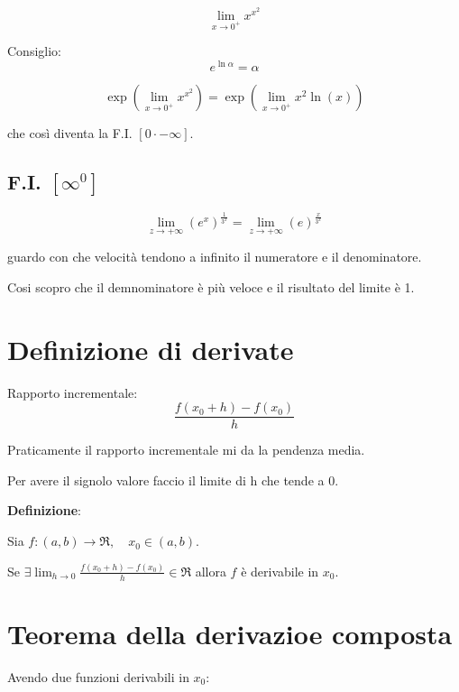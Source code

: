 \documentclass{article}
\begin{document}
\begin{equation*}
    \lim_{x \rightarrow 0^+} x^{x^2}
\end{equation*}

Consiglio:
\begin{equation*}
    e^{\ln \alpha } = \alpha
\end{equation*}

\begin{equation*}
    \exp (\lim_{x \rightarrow 0^+} x^{x^2}) = \exp (\lim_{x \rightarrow 0^+} x^2 \ln (x)) 
\end{equation*}

che così diventa la F.I. $[0 \cdot -\infty]$.

\subsection{F.I. $[\infty^0]$}

\begin{equation*}
    \lim_{z \rightarrow +\infty} (e^x)^{\frac{1}{3^x}} = \lim_{z \rightarrow +\infty} (e)^{\frac{x}{3^x}}
\end{equation*}

guardo con che velocità tendono a infinito il numeratore e il denominatore.

Cosi scopro che il demnominatore è più veloce e il risultato del limite è 1.


\section{Definizione di derivate}
Rapporto incrementale:
\begin{equation*}
    \frac{f(x_0 + h) - f(x_0)}{h}
\end{equation*}

Praticamente il rapporto incrementale mi da la pendenza media.

Per avere il signolo valore faccio il limite di h che tende a 0.

\textbf{Definizione}:


Sia $f:(a,b) \rightarrow \Re, \quad x_0 \in (a,b)$.

Se $\exists \lim_{h \rightarrow 0} \frac{f(x_0 + h) - f(x_0)}{h} \in \Re$ allora $f$ è derivabile in $x_0$.

\section{Teorema della derivazioe composta}
Avendo due funzioni derivabili in $x_0$:
\end{document}
